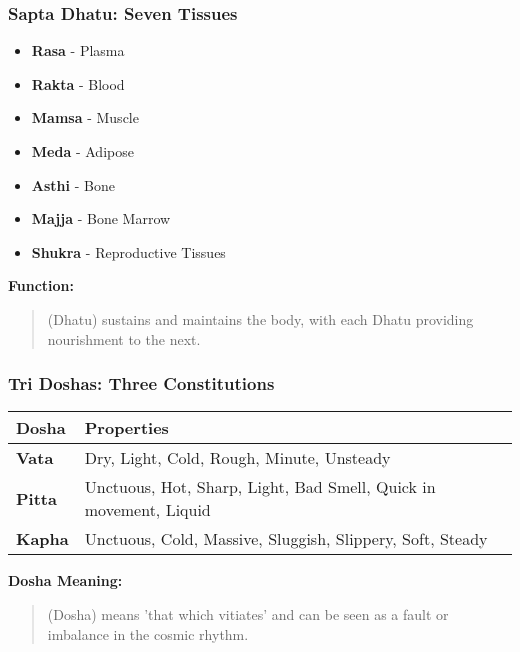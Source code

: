 \begin{frame}[fragile]\frametitle{Sapta Dhatu: Seven Tissues}
    \begin{itemize}
        \item \textbf{Rasa} - Plasma
        \item \textbf{Rakta} - Blood
        \item \textbf{Mamsa} - Muscle
        \item \textbf{Meda} - Adipose
        \item \textbf{Asthi} - Bone
        \item \textbf{Majja} - Bone Marrow
        \item \textbf{Shukra} - Reproductive Tissues
    \end{itemize}
    \vspace{0.5cm}
    \textbf{Function:} 
    \begin{quote}
     (Dhatu) sustains and maintains the body, with each Dhatu providing nourishment to the next.
    \end{quote}
\end{frame}

\begin{frame}[fragile]\frametitle{Tri Doshas: Three Constitutions}
    \begin{tabular}{|l|l|}
    \hline
    \textbf{Dosha} & \textbf{Properties} \\
    \hline
    \textbf{Vata} & Dry, Light, Cold, Rough, Minute, Unsteady \\
    \hline
    \textbf{Pitta} & Unctuous, Hot, Sharp, Light, Bad Smell, Quick in movement, Liquid \\
    \hline
    \textbf{Kapha} & Unctuous, Cold, Massive, Sluggish, Slippery, Soft, Steady \\
    \hline
    \end{tabular}
    \vspace{0.5cm}
    \textbf{Dosha Meaning:}
    \begin{quote}
     (Dosha) means 'that which vitiates' and can be seen as a fault or imbalance in the cosmic rhythm.
    \end{quote}
\end{frame}

